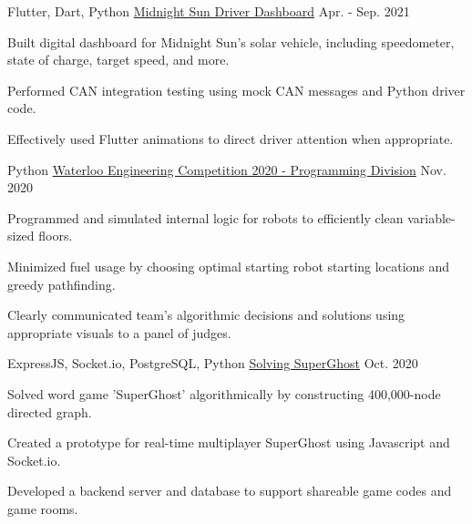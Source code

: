 

\begin{cventries}

  \cventry
    {Flutter, Dart, Python} %
    {\href{https://github.com/uw-midsun/telemetry_xiv}{Midnight Sun Driver Dashboard}} %
    {} %
    {Apr. - Sep. 2021} %
    {
      \begin{cvitems} %
        \item {Built digital dashboard for Midnight Sun's solar vehicle, including speedometer, state of charge, target speed, and more.}
        \item {Performed CAN integration testing using mock CAN messages and Python driver code.}
        \item {Effectively used Flutter animations to direct driver attention when appropriate.}
      \end{cvitems}
    }

  \cventry
    {Python} %
    {\href{https://github.com/danielq987/WECF2020}{Waterloo Engineering Competition 2020 - Programming Division}} %
    {} %
    {Nov. 2020} %
    {
      \begin{cvitems} %
        \item {Programmed and simulated internal logic for robots to efficiently clean variable-sized floors.}
        \item {Minimized fuel usage by choosing optimal starting robot starting locations and greedy pathfinding.}
        \item {Clearly communicated team's algorithmic decisions and solutions using appropriate visuals to a panel of judges.}
      \end{cvitems}
    }

  \cventry
    {ExpressJS, Socket.io, PostgreSQL, Python} %
    {\href{https://github.com/danielq987/superghost-explorer}{Solving SuperGhost}} %
    {} %
    {Oct. 2020} %
    {
      \begin{cvitems} %
        \item {Solved word game 'SuperGhost' algorithmically by constructing 400,000-node directed graph.}
        \item {Created a prototype for real-time multiplayer SuperGhost using Javascript and Socket.io.}
        \item {Developed a backend server and database to support shareable game codes and game rooms.}
      \end{cvitems}
    }


\end{cventries}
